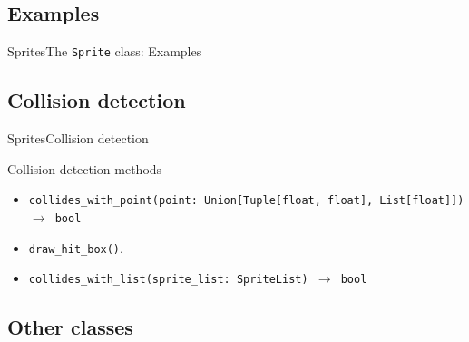 \documentclass[10pt,compress]{beamer} %
\begin{document}
\subsection{Examples}

\begin{frame}[fragile]{Sprites}{The \texttt{Sprite} class: Examples}
	\begin{exampleblock}{}
	
	\end{exampleblock}
\end{frame}

\subsection{Collision detection}

\begin{frame}{Sprites}{Collision detection}
	\begin{block}{Collision detection methods}
		\begin{itemize}
		\item \footnotesize{\texttt{collides\_with\_point(point: Union[Tuple[float, float], List[float]]) $\rightarrow$ bool}} 
		\item \footnotesize{\texttt{draw\_hit\_box()}}. 
		\item \footnotesize{\texttt{collides\_with\_list(sprite\_list: SpriteList) $\rightarrow$ bool}} 
		\end{itemize}
	\end{block}	
\end{frame}

\subsection{Other classes}
\end{document}
